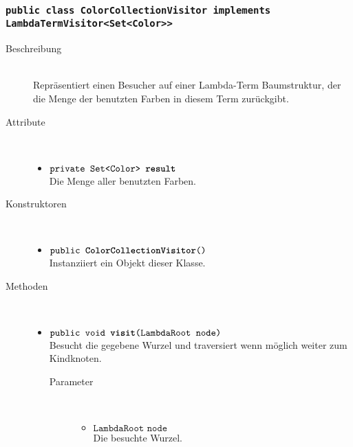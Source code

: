 \subsubsection{\normalfont \texttt{public class \textbf{ColorCollectionVisitor} implements LambdaTermVisitor<Set<Color>{}>}}

\begin{description}
\item[Beschreibung] \hfill \\ Repräsentiert einen Besucher auf einer Lambda-Term Baumstruktur, der die Menge der benutzten Farben in diesem Term zurückgibt.

\item[Attribute] \hfill \\
	\vspace{-.8cm}
	\begin{itemize}
		\item $\texttt{private Set<Color> \textbf{result}}$ \\ Die Menge aller benutzten Farben.
	\end{itemize}

\item[Konstruktoren] \hfill \\
	\vspace{-.8cm}
	\begin{itemize}
		\item $\texttt{public \textbf{ColorCollectionVisitor}()}$ \\ Instanziiert ein Objekt dieser Klasse.
	\end{itemize}

\item[Methoden] \hfill \\
	\vspace{-.8cm}
	\begin{itemize}
		\item $\texttt{public void \textbf{visit}(LambdaRoot node)}$ \\ Besucht die gegebene Wurzel und traversiert wenn möglich weiter zum Kindknoten.
		\begin{description}
			\item[Parameter] \hfill \\
			\vspace{-.8cm}
			\begin{itemize}
				\item $\texttt{LambdaRoot node}$ \\ Die besuchte Wurzel.
			\end{itemize}
		\end{description}
				

\end{itemize}
\end{description}
